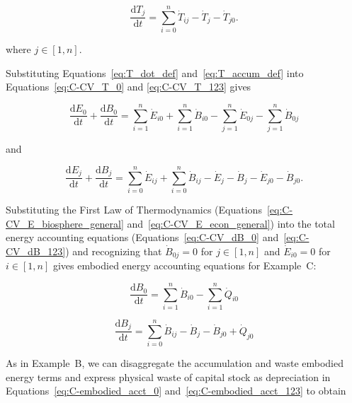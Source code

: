\begin{equation} \label{eq:C-CV_T_123}
	\frac{\mathrm{d}T_{j}}{\mathrm{d}t} 	 
	= \sum\limits_{i=0}^{n} \dot{T}_{ij}
	- \dot{T}_{j}
	- \dot{T}_{j0}.
\end{equation}

\noindent where $j \in [1, n]$.

Substituting Equations~\ref{eq:T_dot_def} 
and~\ref{eq:T_accum_def} into 
Equations~\ref{eq:C-CV_T_0} and
\ref{eq:C-CV_T_123} gives

\begin{equation} \label{eq:C-CV_dB_0}
	\frac{\mathrm{d}E_{0}}{\mathrm{d}t}
	+ \frac{\mathrm{d}B_{0}}{\mathrm{d}t} 	 
	= \sum\limits_{i=1}^{n} \dot{E}_{i0}
	+ \sum\limits_{i=1}^{n} \dot{B}_{i0}
	- \sum\limits_{j=1}^{n} \dot{E}_{0j}
	- \sum\limits_{j=1}^{n} \dot{B}_{0j}
\end{equation}

\noindent and

\begin{equation} \label{eq:C-CV_dB_123}
	\frac{\mathrm{d}E_{j}}{\mathrm{d}t}
	+ \frac{\mathrm{d}B_{j}}{\mathrm{d}t} 	 
	= \sum\limits_{i=0}^{n} \dot{E}_{ij}
	+ \sum\limits_{i=0}^{n} \dot{B}_{ij}
	- \dot{E}_{j}
	- \dot{B}_{j}
	- \dot{E}_{j0}
	- \dot{B}_{j0}.
\end{equation}

Substituting the First Law of Thermodynamics 
(Equations~\ref{eq:C-CV_E_biosphere_general} and~\ref{eq:C-CV_E_econ_general}) 
into the total energy accounting equations 
(Equations~\ref{eq:C-CV_dB_0} and~\ref{eq:C-CV_dB_123}) 
and recognizing that $\dot{B}_{0j} = 0$ for $j \in [1, n]$
and $\dot{E}_{i0} = 0$ for $i \in [1, n]$
gives embodied energy accounting equations for Example~C: %

\begin{equation} \label{eq:C-embodied_acct_0}
	\frac{\mathrm{d}B_{0}}{\mathrm{d}t} 	 
	= \sum\limits_{i=1}^{n} \dot{B}_{i0}
	- \sum\limits_{i=1}^{n} \dot{Q}_{i0}
\end{equation}

\begin{equation} \label{eq:C-embodied_acct_123}
	\frac{\mathrm{d}B_{j}}{\mathrm{d}t} 	 
	= \sum\limits_{i=0}^{n} \dot{B}_{ij}
	- \dot{B}_{j}
	- \dot{B}_{j0}
	+ \dot{Q}_{j0} 
\end{equation}

As in Example~B, 
we can disaggregate the accumulation and waste embodied energy terms 
and express physical waste of capital stock as depreciation 
in Equations~\ref{eq:C-embodied_acct_0}
and~\ref{eq:C-embodied_acct_123}
to obtain

